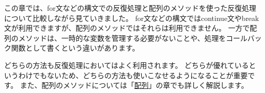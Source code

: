 この章では、for文などの構文での反復処理と配列のメソッドを使った反復処理について比較しながら見ていきました。
for文などの構文ではcontinue文やbreak文が利用できますが、配列のメソッドではそれらは利用できません。
一方で配列のメソッドは、一時的な変数を管理する必要がないことや、処理をコールバック関数として書くという違いがあります。

どちらの方法も反復処理においてはよく利用されます。
どちらが優れているというわけでもないため、どちらの方法も使いこなせるようになることが重要です。
また、配列のメソッドについては「\href{../array/README.md}{配列}」の章でも詳しく解説します。
